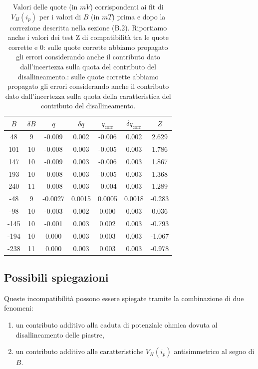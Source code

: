 \begin{table}
\centering \small
\begin{tabular}{cc|cc|ccc}
$B$ & $\delta B$ & $q$ & $\delta q$ & $q_\text{corr}$ & $\delta q_\text{corr}$ & $Z$ \\
\hline
48 & 9 & -0.009 & 0.002 & -0.006 & 0.002 & 2.629 \\
101 & 10 & -0.008 & 0.003 & -0.005 & 0.003 & 1.786\\
147 & 10 & -0.009 & 0.003 & -0.006 & 0.003 & 1.867 \\
193 & 10 & -0.008 & 0.003 & -0.005 & 0.003 & 1.368 \\
240 & 11 & -0.008 & 0.003 & -0.004 & 0.003 & 1.289  \\
-48 & 9 & -0.0027 & 0.0015 & 0.0005 & 0.0018 & -0.283\\
-98 & 10 & -0.003 & 0.002 & 0.000 & 0.003 & 0.036\\
-145 & 10 & -0.001 & 0.003 & 0.002 & 0.003 & -0.793\\
-194 & 10 & 0.000 & 0.003 & 0.003 & 0.003 & -1.067\\
-238 & 11 & 0.000 & 0.003 & 0.003 & 0.003 & -0.978
\end{tabular}
\caption{Valori delle quote (in $ \unit{mV} $) corrispondenti ai fit di $ V_H(i_p) $ per i valori di $ B $ (in $ \unit{mT} $) prima e dopo la correzione descritta nella sezione (B.2). Riportiamo anche i valori dei test Z di compatibilità tra le quote corrette e $ 0 $: sulle quote corrette abbiamo propagato gli errori considerando anche il contributo dato dall'incertezza sulla quota del contributo del disallineamento.: sulle quote corrette abbiamo propagato gli errori considerando anche il contributo dato dall'incertezza sulla quota della caratteristica del contributo del disallineamento.}
\label{tab:qcorr}
\end{table}


\subsection{Possibili spiegazioni}

Queste incompatibilità possono essere spiegate tramite la combinazione di due fenomeni:
\begin{enumerate}
\item un contributo additivo alla caduta di potenziale ohmica dovuta al disallineamento delle piastre,
\item un contributo additivo alle caratteristiche $ V_H(i_p) $ antisimmetrico al segno di $ B $.
\end{enumerate}

